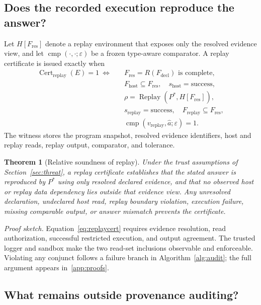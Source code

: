 \documentclass[5p,times]{elsarticle}
\newtheorem{theorem}{Theorem}
\newcommand{\tol}{\varepsilon}
\begin{document}
\subsection{Does the recorded execution reproduce the answer?}\label{sec:reproducible}

Let $H[F_{\mathrm{res}}]$ denote a replay environment that exposes only the resolved evidence view, and let $\operatorname{cmp}(\cdot,\cdot;\tol)$ be a frozen type-aware comparator. A replay certificate is issued exactly when
\begin{equation}
\begin{aligned}
\operatorname{Cert}_{\mathrm{replay}}(E)=1
\ \Longleftrightarrow\quad
&F_{\mathrm{res}}=R(F_{\mathrm{decl}})\text{ is complete},\\
&F_{\mathrm{host}}\subseteq F_{\mathrm{res}},\quad
  s_{\mathrm{host}}=\mathrm{success},\\
&\rho=\operatorname{Replay}(P^*,H[F_{\mathrm{res}}]),\\
&s_{\mathrm{replay}}=\mathrm{success},\quad
  F_{\mathrm{replay}}\subseteq F_{\mathrm{res}},\\
&\operatorname{cmp}(v_{\mathrm{replay}},\hat a;\tol)=1.
\end{aligned}
\label{eq:replaycert}
\end{equation}
The witness stores the program snapshot, resolved evidence identifiers, host and replay reads, replay output, comparator, and tolerance.

\begin{theorem}[Relative soundness of replay]\label{thm:relative}
Under the trust assumptions of Section~\ref{sec:threat}, a replay certificate establishes that the stated answer is reproduced by $P^*$ using only resolved declared evidence, and that no observed host or replay data dependency lies outside that evidence view. Any unresolved declaration, undeclared host read, replay boundary violation, execution failure, missing comparable output, or answer mismatch prevents the certificate.
\end{theorem}
\noindent\emph{Proof sketch.} Equation~\ref{eq:replaycert} requires evidence resolution, read authorization, successful restricted execution, and output agreement. The trusted logger and sandbox make the two read-set inclusions observable and enforceable. Violating any conjunct follows a failure branch in Algorithm~\ref{alg:audit}; the full argument appears in~\ref{app:proofs}.

\subsection{What remains outside provenance auditing?}\label{sec:nonimplication}
\end{document}
